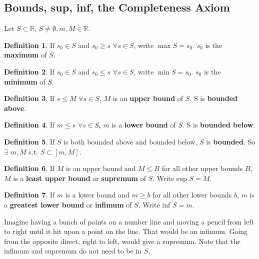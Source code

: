 \documentclass{article}
\theoremstyle{definition}
\newtheorem{definition}{Definition}[section]
\begin{document}
\subsection{Bounds, sup, inf, the Completeness Axiom}

Let $S \subset \mathbb{R}$, $S \neq \emptyset, m, M \in \mathbb{R}$. 

\begin{definition}
If $s_0 \in S$ and $s_0 \ge s$ $\forall s \in S$, write $\max S = s_0$. $s_0$ is the \textbf{maximum} of $S$.
\end{definition}

\begin{definition}
If $s_0 \in S$ and $s_0 \le s$ $\forall s \in S$, write $\min S = s_0$. $s_0$ is the \textbf{minimum} of $S$.
\end{definition}

\begin{definition}
If $s \leq M$ $\forall s \in S$, $M$ is an \textbf{upper bound} of $S$. S is \textbf{bounded above}.
\end{definition}

\begin{definition}
If $m \leq s$ $\forall s \in S$, $m$ is a \textbf{lower bound} of $S$. S is \textbf{bounded below}.
\end{definition}

\begin{definition}
If $S$ is both bounded above and bounded below, $S$ is \textbf{bounded}. So $\exists$ $m, M$ s.t. $S \subset [m, M]$.
\end{definition}

\begin{definition}
If $M$ is an upper bound and $M \leq B$ for all other upper bounds $B$, $M$ is a \textbf{least upper bound} or \textbf{supremum} of $S$. Write sup $S = M$.
\end{definition}

\begin{definition}
If $m$ is a lower bound and $m \geq b$ for all other lower bounds $b$, $m$ is a \textbf{greatest lower bound} or \textbf{infimum} of $S$. Write inf $S = m$.
\end{definition}

Imagine having a bunch of points on a number line and moving a pencil from left to right until it hit upon a point on the line. That would be an infimum. Going from the opposite direct, right to left, would give a supremum. Note that the infimum and supremum do not need to be in $S$.
\end{document}
